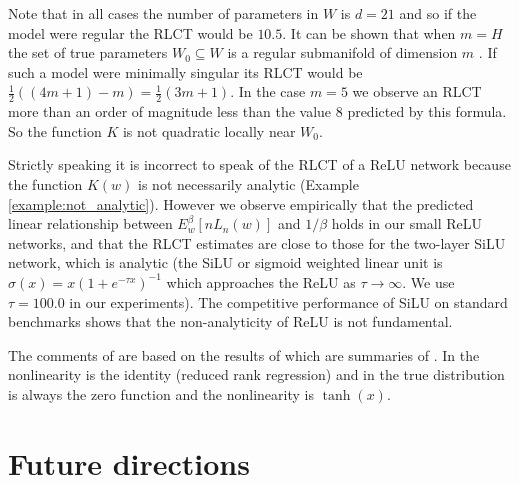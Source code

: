 \documentclass{article} %
\begin{document}
Note that in all cases the number of parameters in $W$ is $d = 21$ and so if the model were regular the RLCT would be $10.5$. It can be shown that when $m = H$ the set of true parameters $W_0 \subseteq W$ is a regular submanifold of dimension $m$ \cite{???}. If such a model were minimally singular its RLCT would be $\tfrac{1}{2}( (4m + 1) - m ) = \tfrac{1}{2}( 3m + 1 )$. In the case $m = 5$ we observe an RLCT more than an order of magnitude less than the value $8$ predicted by this formula. So the function $K$ is not quadratic locally near $W_0$.

Strictly speaking it is incorrect to speak of the RLCT of a ReLU network because the function $K(w)$ is not necessarily analytic (Example \ref{example:not_analytic}). However we observe empirically that the predicted linear relationship between $E^\beta_w[nL_n(w)]$ and $1/\beta$ holds in our small ReLU networks, and that the RLCT estimates are close to those for the two-layer SiLU network, which is analytic (the SiLU or sigmoid weighted linear unit is $\sigma(x) = x (1 + e^{-\tau x})^{-1}$ which approaches the ReLU as $\tau \to \infty$. We use $\tau = 100.0$ in our experiments). The competitive performance of SiLU on standard benchmarks \cite{???} shows that the non-analyticity of ReLU is not fundamental.

\begin{remark} The comments of \citet[\S 7.6]{watanabe_algebraic_2009} are based on the results of \citet[\S 7.2]{watanabe_algebraic_2009} which are summaries of \cite{??,??}. In \cite{??} the nonlinearity is the identity (reduced rank regression) and in \cite{??} the true distribution is always the zero function and the nonlinearity is $\operatorname{tanh}(x)$.
\end{remark}


\section{Future directions}
\end{document}
